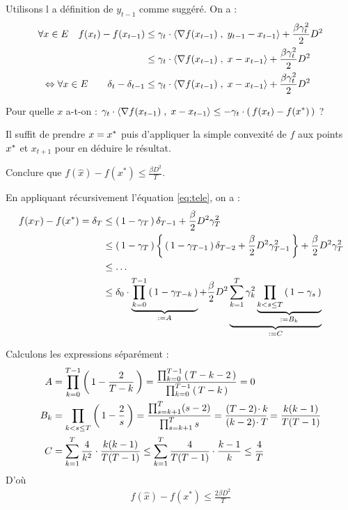 \begin{rep}

Utilisons l
a définition de $y_{t-1}$ comme suggéré. On a :
\begin{align*}
  \forall x \in E \quad   f(x_{t})-f(x_{t-1}) &\leq
  \gamma_t\cdot\langle \operatorname{\nabla\!} f(x_{t-1}) \;,\;  y_{t-1}-x_{t-1} \rangle+\frac{\beta \gamma_t^2}{2}
  D^2\\
  &\leq   \gamma_t\cdot\langle \operatorname{\nabla\!} f(x_{t-1}) \;,\;  x-x_{t-1} \rangle+\frac{\beta \gamma_t^2}{2}
    D^2\\
    \Leftrightarrow \forall x \in E \qquad \delta_t - \delta_{t-1} &\leq \gamma_t\cdot\langle \operatorname{\nabla\!} f(x_{t-1}) \;,\;  x-x_{t-1} \rangle+\frac{\beta \gamma_t^2}{2}
      D^2
\end{align*}

Pour quelle $x$ a-t-on : $\displaystyle \gamma_t \cdot  \langle \operatorname{\nabla\!} f(x_{t-1}) \;,\;  x-x_{t-1} \rangle
\leq - \gamma_t \cdot  \left( \, f(x_t)-f(x^{*}) \, \right)$ ?

Il suffit de prendre $x = x^{*}$ puis d'appliquer la simple convexité de $f$ aux points
 $x^{*}$ et $x_{t+1}$ pour en déduire le résultat.

\end{rep}

\begin{qst}

Conclure que $\displaystyle f ( \hat { x } ) - f \left( x ^ { * } \right) \leq \frac { \beta D ^ { 2 } } { T }$.
\end{qst}

\begin{rep}

En appliquant récursivement l'équation \eqref{eq:tele}, on a :
\begin{align*}
  f(x_T)-f(x^{*}) = \delta_T &\leq \left( \, 1-\gamma_T \, \right)\delta_{T-1}+ \frac{\beta}{2} D^2 \gamma_T^2\\
&\leq \left( \, 1-\gamma_T \, \right)\left \{ \, \left( \, 1-\gamma_{T-1} \, \right)\delta_{T-2}+ \frac{\beta}{2} D^2 \gamma_{T-1}^2 \, \right \}+ \frac{\beta}{2} D^2 \gamma_T^2\\
&\leq \ldots\\
&\leq \delta_0\cdot  \underbrace{\prod_{k=0}^{T-1} \left( \, 1-\gamma_{T-k} \, \right)}_{:=A}+ \frac{\beta}{2}D^2
\underbrace{\sum_{k=1}^T \gamma_k^2\underbrace{\prod_{k<s\leq T} \left( \, 1-\gamma_s \, \right)}_{:=B_k}}_{:=C}
\end{align*}

Calculons les expressions séparément :
\begin{align*}
  A &= \prod_{k=0}^{T-1} \left( \, 1-\frac{2}{T-k} \, \right)
  = \frac{\prod_{k=0}^{T-1} \left( \, T-k-2 \, \right)}{\prod_{k=0}^{T-1} \left( \, T-k \, \right)}= 0\\
  B_k &= \prod_{k<s\leq T} \left( \, 1-\frac{2}{s} \, \right) = \frac{\prod_{s=k+1}^T(s-2)}{
  \prod_{s=k+1}^T s
  }=\frac{(T-2)\! \cdot k\!}{(k-2)\! \cdot T\!}=\frac{k(k-1)}{T(T-1)}\\
  C &= \sum_{k=1}^T \frac{4}{k^2} \cdot \frac{k(k-1)}{T(T-1)}
  \leq \sum_{k=1}^T \frac{4}{T(T-1)} \cdot \frac{k-1}{k} \leq \frac{4}{T}
\end{align*}
D'où
\begin{align*}
  f ( \hat { x } ) - f \left( x ^ { * } \right) \leq \frac { 2 \beta D ^ { 2 } } { T }
\end{align*}
\end{rep}
